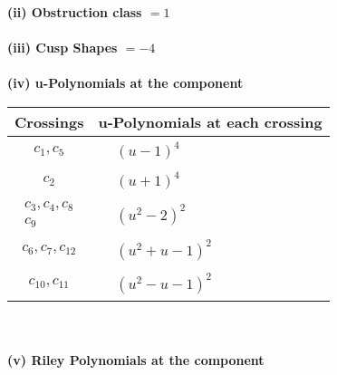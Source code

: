 \documentclass[1p]{elsarticle_modified}
\theoremstyle{definition}
\begin{document}
\flushleft \textbf{(ii) Obstruction class $= 1$}\\~\\
\flushleft \textbf{(iii) Cusp Shapes $= -4$}\\~\\
\newpage\renewcommand{\arraystretch}{1}
\flushleft \textbf{(iv) u-Polynomials at the component}\newline \\
\begin{tabular}{m{50pt}|m{274pt}}
Crossings & \hspace{64pt}u-Polynomials at each crossing \\
\hline $$\begin{aligned}c_{1},c_{5}\end{aligned}$$&$\begin{aligned}
&(u-1)^4
\end{aligned}$\\
\hline $$\begin{aligned}c_{2}\end{aligned}$$&$\begin{aligned}
&(u+1)^4
\end{aligned}$\\
\hline $$\begin{aligned}c_{3},c_{4},c_{8}\\c_{9}\end{aligned}$$&$\begin{aligned}
&(u^2-2)^2
\end{aligned}$\\
\hline $$\begin{aligned}c_{6},c_{7},c_{12}\end{aligned}$$&$\begin{aligned}
&(u^2+u-1)^2
\end{aligned}$\\
\hline $$\begin{aligned}c_{10},c_{11}\end{aligned}$$&$\begin{aligned}
&(u^2- u-1)^2
\end{aligned}$\\
\hline
\end{tabular}\\~\\
\newpage\renewcommand{\arraystretch}{1}
\flushleft \textbf{(v) Riley Polynomials at the component}\newline \\
\end{document}
